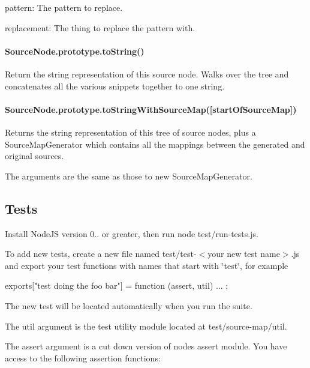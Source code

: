 \begin{DoxyItemize}
\item {\ttfamily pattern}\+: The pattern to replace.
\item {\ttfamily replacement}\+: The thing to replace the pattern with.
\end{DoxyItemize}

\paragraph*{Source\+Node.\+prototype.\+to\+String()}

Return the string representation of this source node. Walks over the tree and concatenates all the various snippets together to one string.

\paragraph*{Source\+Node.\+prototype.\+to\+String\+With\+Source\+Map(\mbox{[}start\+Of\+Source\+Map\mbox{]})}

Returns the string representation of this tree of source nodes, plus a Source\+Map\+Generator which contains all the mappings between the generated and original sources.

The arguments are the same as those to {\ttfamily new Source\+Map\+Generator}.

\subsection*{Tests}

\href{https://travis-ci.org/mozilla/source-map}{\tt }

Install Node\+JS version 0.. or greater, then run {\ttfamily node test/run-\/tests.\+js}.

To add new tests, create a new file named {\ttfamily test/test-\/$<$your new test name$>$.js} and export your test functions with names that start with \char`\"{}test\char`\"{}, for example \begin{DoxyVerb}exports["test doing the foo bar"] = function (assert, util) {
  ...
};
\end{DoxyVerb}


The new test will be located automatically when you run the suite.

The {\ttfamily util} argument is the test utility module located at {\ttfamily test/source-\/map/util}.

The {\ttfamily assert} argument is a cut down version of node\textquotesingle{}s assert module. You have access to the following assertion functions\+:


